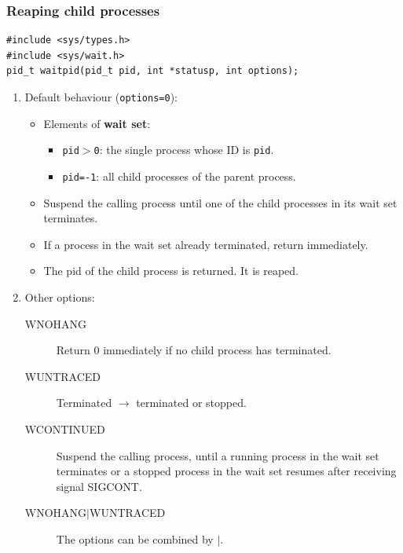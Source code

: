 \subsubsection{Reaping child processes}
\begin{lstlisting}[frame=single]
#include <sys/types.h>
#include <sys/wait.h>
pid_t waitpid(pid_t pid, int *statusp, int options);
\end{lstlisting}
\begin{enumerate}
\item Default behaviour (\texttt{options=0}):
\begin{itemize}
	\item Elements of \textbf{wait set}:
	\begin{itemize}
		\item \texttt{pid$\mathtt{>}$0}: the single process whose ID is \texttt{pid}.
		\item \texttt{pid=-1}: all child processes of the parent process.
	\end{itemize}
	\item Suspend the calling process until one of the child processes in its wait set terminates.
	\item If a process in the wait set already terminated, return immediately.
	\item The pid of the child process is returned. It is reaped.
\end{itemize} 

\item Other options:
\begin{description}
\item[WNOHANG]Return 0 immediately if no child process has terminated.
\item[WUNTRACED]Terminated $\rightarrow$ terminated or stopped.
\item[WCONTINUED]Suspend the calling process, until a running process in the wait set terminates or a stopped process in the wait set resumes after receiving signal SIGCONT.
\item[WNOHANG$|$WUNTRACED]The options can be combined by $|$.
\end{description}


\end{enumerate}
